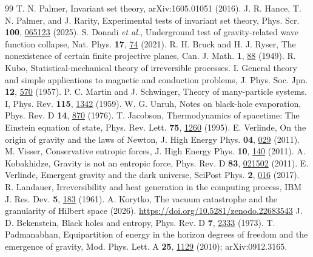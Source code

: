 \documentclass[aps,prd,twocolumn,superscriptaddress,nofootinbib,showkeys]{revtex4-2}
\begin{document}
\begin{thebibliography}{99}
 T. N. Palmer, Invariant set theory, arXiv:1605.01051 (2016).
 J. R. Hance, T. N. Palmer, and J. Rarity, Experimental tests of invariant set theory, Phys. Scr. \textbf{100}, \href{https://doi.org/10.1088/1402-4896/add9d7}{065123} (2025).
 S. Donadi \emph{et al.}, Underground test of gravity-related wave function collapse, Nat. Phys. \textbf{17}, \href{https://doi.org/10.1038/s41567-020-1008-4}{74} (2021).
 R. H. Bruck and H. J. Ryser, The nonexistence of certain finite projective planes, Can. J. Math. \textbf{1}, \href{https://doi.org/10.4153/CJM-1949-009-2}{88} (1949).
 R. Kubo, Statistical-mechanical theory of irreversible processes. I. General theory and simple applications to magnetic and conduction problems, J. Phys. Soc. Jpn. \textbf{12}, \href{https://doi.org/10.1143/JPSJ.12.570}{570} (1957).
 P. C. Martin and J. Schwinger, Theory of many-particle systems. I, Phys. Rev. \textbf{115}, \href{https://doi.org/10.1103/PhysRev.115.1342}{1342} (1959).
 W. G. Unruh, Notes on black-hole evaporation, Phys. Rev. D \textbf{14}, \href{https://doi.org/10.1103/PhysRevD.14.870}{870} (1976).
 T. Jacobson, Thermodynamics of spacetime: The Einstein equation of state, Phys. Rev. Lett. \textbf{75}, \href{https://doi.org/10.1103/PhysRevLett.75.1260}{1260} (1995).
 E. Verlinde, On the origin of gravity and the laws of Newton, J. High Energy Phys. \textbf{04}, \href{https://doi.org/10.1007/JHEP04(2011)029}{029} (2011).
 M. Visser, Conservative entropic forces, J. High Energy Phys. \textbf{10}, \href{https://doi.org/10.1007/JHEP10(2011)140}{140} (2011).
 A. Kobakhidze, Gravity is not an entropic force, Phys. Rev. D \textbf{83}, \href{https://doi.org/10.1103/PhysRevD.83.021502}{021502} (2011).
 E. Verlinde, Emergent gravity and the dark universe, SciPost Phys. \textbf{2}, \href{https://doi.org/10.21468/SciPostPhys.2.3.016}{016} (2017).
 R. Landauer, Irreversibility and heat generation in the computing process, IBM J. Res. Dev. \textbf{5}, \href{https://doi.org/10.1147/rd.53.0183}{183} (1961).
 A. Korytko, The vacuum catastrophe and the granularity of Hilbert space (2026). \url{https://doi.org/10.5281/zenodo.22683543}
 J. D. Bekenstein, Black holes and entropy, Phys. Rev. D \textbf{7}, \href{https://doi.org/10.1103/PhysRevD.7.2333}{2333} (1973).
 T. Padmanabhan, Equipartition of energy in the horizon degrees of freedom and the emergence of gravity, Mod. Phys. Lett. A \textbf{25}, \href{https://doi.org/10.1142/S021773231003313X}{1129} (2010); arXiv:0912.3165.

\end{thebibliography}
\end{document}

